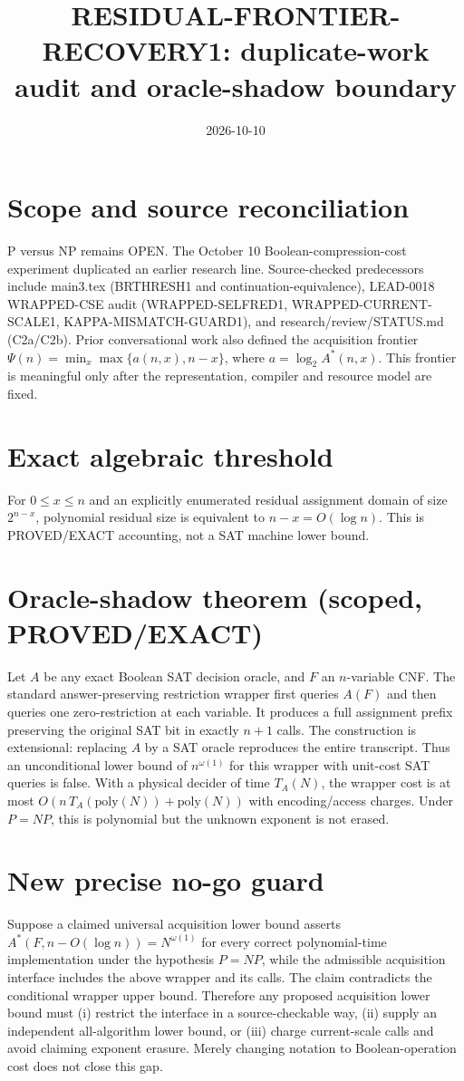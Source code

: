 \documentclass{article}
\begin{document}
\title{RESIDUAL-FRONTIER-RECOVERY1: duplicate-work audit and oracle-shadow boundary}
\date{2026-10-10}
\maketitle
\section*{Scope and source reconciliation}
P versus NP remains OPEN. The October 10 Boolean-compression-cost experiment duplicated an earlier research line. Source-checked predecessors include main3.tex (BRTHRESH1 and continuation-equivalence), LEAD-0018 WRAPPED-CSE audit (WRAPPED-SELFRED1, WRAPPED-CURRENT-SCALE1, KAPPA-MISMATCH-GUARD1), and research/review/STATUS.md (C2a/C2b). Prior conversational work also defined the acquisition frontier $\Psi(n)=\min_x\max\{a(n,x),n-x\}$, where $a=\log_2 A^*(n,x)$. This frontier is meaningful only after the representation, compiler and resource model are fixed.
\section*{Exact algebraic threshold}
For $0\le x\le n$ and an explicitly enumerated residual assignment domain of size $2^{n-x}$, polynomial residual size is equivalent to $n-x=O(\log n)$. This is PROVED/EXACT accounting, not a SAT machine lower bound.
\section*{Oracle-shadow theorem (scoped, PROVED/EXACT)}
Let $A$ be any exact Boolean SAT decision oracle, and $F$ an $n$-variable CNF. The standard answer-preserving restriction wrapper first queries $A(F)$ and then queries one zero-restriction at each variable. It produces a full assignment prefix preserving the original SAT bit in exactly $n+1$ calls. The construction is extensional: replacing $A$ by a SAT oracle reproduces the entire transcript. Thus an unconditional lower bound of $n^{\omega(1)}$ for this wrapper with unit-cost SAT queries is false. With a physical decider of time $T_A(N)$, the wrapper cost is at most $O(n\,T_A(\mathrm{poly}(N))+\mathrm{poly}(N))$ with encoding/access charges. Under $P=NP$, this is polynomial but the unknown exponent is not erased.
\section*{New precise no-go guard}
Suppose a claimed universal acquisition lower bound asserts $A^*(F,n-O(\log n))=N^{\omega(1)}$ for every correct polynomial-time implementation under the hypothesis $P=NP$, while the admissible acquisition interface includes the above wrapper and its calls. The claim contradicts the conditional wrapper upper bound. Therefore any proposed acquisition lower bound must (i) restrict the interface in a source-checkable way, (ii) supply an independent all-algorithm lower bound, or (iii) charge current-scale calls and avoid claiming exponent erasure. Merely changing notation to Boolean-operation cost does not close this gap.
\end{document}
